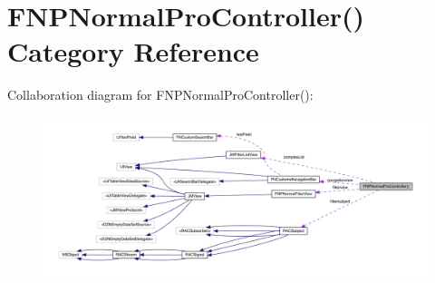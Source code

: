\hypertarget{category_f_n_p_normal_pro_controller_07_08}{}\section{F\+N\+P\+Normal\+Pro\+Controller() Category Reference}
\label{category_f_n_p_normal_pro_controller_07_08}


Collaboration diagram for F\+N\+P\+Normal\+Pro\+Controller()\+:\nopagebreak
\begin{figure}[H]
\begin{center}
\leavevmode
\includegraphics[width=350pt]{category_f_n_p_normal_pro_controller_07_08__coll__graph}
\end{center}
\end{figure}
